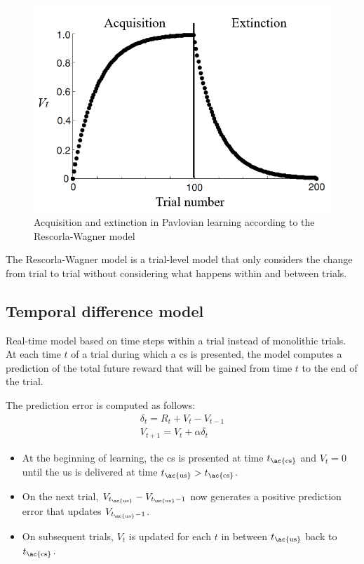 \begin{figure}[H]
    \centering
    \includegraphics[width=0.4\linewidth]{./img/rescorla_wagner_curve.png}
    \caption{Acquisition and extinction in Pavlovian learning according to the Rescorla-Wagner model}
\end{figure}

\begin{remark}
    The Rescorla-Wagner model is a trial-level model that only considers the change from trial to trial
    without considering what happens within and between trials.
\end{remark}


\subsection{Temporal difference model}

Real-time model based on time steps within a trial instead of monolithic trials.
At each time $t$ of a trial during which a \ac{cs} is presented,
the model computes a prediction of the total future reward that will be gained from time $t$ to the end of the trial.

The prediction error is computed as follows:
\begin{gather*}
    \delta_t = R_t + V_t - V_{t-1} \\
    V_{t+1} = V_t + \alpha \delta_t
\end{gather*}

\begin{itemize}
    \item At the beginning of learning, the \ac{cs} is presented at time $t_\text{\ac{cs}}$
        and $V_t = 0$ until the \ac{us} is delivered at time $t_\text{\ac{us}} > t_\text{\ac{cs}}$.
    \item On the next trial, $V_{t_\text{\ac{us}}} - V_{t_\text{\ac{us}} - 1}$ now generates a positive prediction error that updates $V_{t_\text{\ac{us}} - 1}$.
    \item On subsequent trials, $V_t$ is updated for each $t$ in between $t_\text{\ac{us}}$ back to $t_\text{\ac{cs}}$.
\end{itemize}

